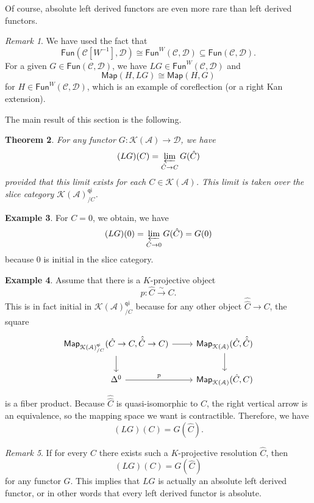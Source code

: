 \documentclass[10pt]{amsart}
\newtheorem{thm}{Theorem}[subsection]
\theoremstyle{definition}
\newtheorem{exm}[thm]{Example}
\theoremstyle{remark}
\newtheorem{rmk}[thm]{Remark}
\theoremstyle{plain}
\theoremstyle{definition}
\theoremstyle{remark}
\newcommand{\mc}[1]{\mathcal{#1}}
\newcommand{\ms}[1]{\mathsf{#1}}
\newcommand{\1}{\mathbf{1}}
\newcommand{\2}{\mathbf{2}}
\newcommand{\3}{\mathbf{3}}
\begin{document}
Of course, absolute left derived functors are even more rare than left derived functors.

\begin{rmk}
    We have used the fact that
    \[ \ms{Fun}(\mc{C}[W^{-1}], \mc{D}) \cong \ms{Fun}^W(\mc{C}, \mc{D}) \subseteq \ms{Fun}(\mc{C}, \mc{D}). \]
    For a given $G \in \ms{Fun}(\mc{C}, \mc{D})$, we have $LG \in \ms{Fun}^W(\mc{C}, \mc{D})$ and
    \[ \ms{Map}(H, LG) \cong \ms{Map}(H, G) \]
    for $H \in \ms{Fun}^W(\mc{C}, \mc{D})$, which is an example of coreflection (or a right Kan extension).
\end{rmk}

The main result of this section is the following.
\begin{thm}\label{thm:formulaleftderived}
    For any functor $G \colon \mc{K}(\mc{A}) \to \mc{D}$, we have
    \[ (LG)(C) = \varprojlim_{\hat{C} \to C} G(\hat{C}) \]
    provided that this limit exists for each $C \in \mc{K}(\mc{A})$. This limit is taken over the slice category $\mc{K}(\mc{A})_{/C}^{\ms{qi}}$.
\end{thm}

\begin{exm}
    For $C = 0$, we obtain, we have
    \[ (LG)(0) = \varprojlim_{\hat{C} \to 0} G(\hat{C}) = G(0) \]
    because $0$ is initial in the slice category.
\end{exm}

\begin{exm}
    Assume that there is a $K$-projective object 
    \[ p \colon \hat{C} \xrightarrow{\sim} C. \]
    This is in fact initial in $\mc{K}(\mc{A})_{/C}^{\ms{qi}}$ because for any other object $\hat{\hat{C}} \to C$, the square
    \begin{equation*}
    \begin{tikzcd}
        \ms{Map}_{\mc{K}(\mc{A})_{/C}^{\ms{qi}}}(\hat{C} \to C, \hat{\hat{C}} \to C) \ar{r} \ar{d} & \ms{Map}_{\mc{K}(\mc{A})} (\hat{C}, \hat{\hat{C}}) \ar{d} \\
        \Delta^0 \ar{r}{p} & \ms{Map}_{\mc{K}(\mc{A})}(\hat{C}, C)
    \end{tikzcd}
    \end{equation*}
    is a fiber product. Because $\hat{\hat{C}}$ is quasi-isomorphic to $C$, the right vertical arrow is an equivalence, so the mapping space we want is contractible. Therefore, we have
    \[ (LG)(C) = G(\hat{C}). \]
\end{exm}

\begin{rmk}
    If for every $C$ there exists such a $K$-projective resolution $\hat{C}$, then
    \[ (LG)(C) = G(\hat{C}) \]
    for any functor $G$. This implies that $LG$ is actually an absolute left derived functor, or in other words that every left derived functor is absolute.
\end{rmk}
\end{document}
